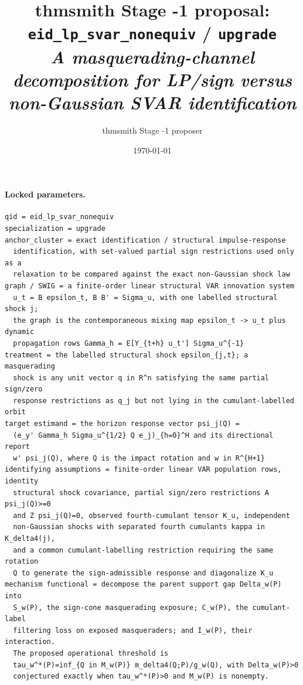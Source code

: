 \documentclass[11pt]{article}
\title{thmsmith Stage -1 proposal: \texttt{eid\_lp\_svar\_nonequiv} / \texttt{upgrade}%
  \\ \large\textit{A masquerading-channel decomposition for LP/sign versus non-Gaussian SVAR identification}}
\author{thmsmith Stage -1 proposer}
\date{\today}
\theoremstyle{definition}
\theoremstyle{plain}
\theoremstyle{remark}
\begin{document}
\maketitle


\paragraph{Locked parameters.}
\begin{verbatim}
qid = eid_lp_svar_nonequiv
specialization = upgrade
anchor_cluster = exact identification / structural impulse-response
  identification, with set-valued partial sign restrictions used only as a
  relaxation to be compared against the exact non-Gaussian shock law
graph / SWIG = a finite-order linear structural VAR innovation system
  u_t = B epsilon_t, B B' = Sigma_u, with one labelled structural shock j;
  the graph is the contemporaneous mixing map epsilon_t -> u_t plus dynamic
  propagation rows Gamma_h = E[Y_{t+h} u_t'] Sigma_u^{-1}
treatment = the labelled structural shock epsilon_{j,t}; a masquerading
  shock is any unit vector q in R^n satisfying the same partial sign/zero
  response restrictions as q_j but not lying in the cumulant-labelled orbit
target estimand = the horizon response vector psi_j(Q) =
  (e_y' Gamma_h Sigma_u^{1/2} Q e_j)_{h=0}^H and its directional report
  w' psi_j(Q), where Q is the impact rotation and w in R^{H+1}
identifying assumptions = finite-order linear VAR population rows, identity
  structural shock covariance, partial sign/zero restrictions A psi_j(Q)>=0
  and Z psi_j(Q)=0, observed fourth-cumulant tensor K_u, independent
  non-Gaussian shocks with separated fourth cumulants kappa in K_delta4(j),
  and a common cumulant-labelling restriction requiring the same rotation
  Q to generate the sign-admissible response and diagonalize K_u
mechanism functional = decompose the parent support gap Delta_w(P) into
  S_w(P), the sign-cone masquerading exposure; C_w(P), the cumulant-label
  filtering loss on exposed masqueraders; and I_w(P), their interaction.
  The proposed operational threshold is
  tau_w^*(P)=inf_{Q in M_w(P)} m_delta4(Q;P)/g_w(Q), with Delta_w(P)>0
  conjectured exactly when tau_w^*(P)>0 and M_w(P) is nonempty.
\end{verbatim}
\end{document}
